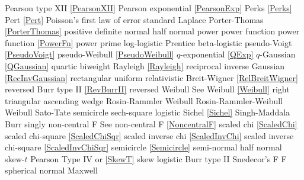 Pearson type XII 				\dotfill	\eqref{PearsonXII}					\ncite	%
Pearson exponential				\dotfill	\eqref{PearsonExp}					\mcite{\self}
Perks							\dotfill	\eqref{Perks} 						\ncite	%
Pert							\dotfill	\eqref{Pert} 						\ncite	%
Poisson's first law of error	\dotfill	standard Laplace					\ncite	%
Porter-Thomas					\dotfill	\eqref{PorterThomas}				\ncite
positive definite normal 		\dotfill	half normal 						\ncite 	%
power							\dotfill	power function 						\ncite	%
power function					\dotfill	\eqref{PowerFn}						\ncite	%
power prime						\dotfill	log-logistic						\mcite{\self}
Prentice 						\dotfill	beta-logistic							
pseudo-Voigt					\dotfill	\eqref{PseudoVoigt}					\ncite
pseudo-Weibull					\dotfill	\eqref{PseudoWeibull}				\ncite	%
%
$q$-exponential					\dotfill	\eqref{QExp}						\ncite	%
$q$-Gaussian					\dotfill	\eqref{QGaussian}					\ncite	%
quartic							\dotfill	biweight							\ncite
%
Rayleigh  						\dotfill	\eqref{Rayleigh}					\ncite	%
reciprocal inverse Gaussian		\dotfill	\eqref{RecInvGaussian}				\ncite
rectangular						\dotfill	uniform 							\ncite	%
relativistic Breit-Wigner		\dotfill	\eqref{RelBreitWigner}				\ncite	%
reversed Burr type II			\dotfill	\eqref{RevBurrII} 					\ncite	%
reversed Weibull				\dotfill	See Weibull \eqref{Weibull}			\ncite	%
right triangular				\dotfill	ascending wedge 					\ncite	%
Rosin-Rammler 					\dotfill	Weibull								   		%
Rosin-Rammler-Weibull 			\dotfill	Weibull								\ncite	%
%
Sato-Tate						\dotfill	semicircle 							\ncite	%
sech-square 					\dotfill	logistic							\ncite	%
Sichel							\dotfill	\eqref{Sichel}						\ncite	
Singh-Maddala 					\dotfill	Burr 								\ncite	%
singly non-central F       		\dotfill	See non-central F  \eqref{NoncentralF}	\ncite 
scaled chi						\dotfill	\eqref{ScaledChi}					\ncite	%
scaled chi-square 				\dotfill	\eqref{ScaledChiSqr}				\ncite	%
scaled inverse chi 				\dotfill	\eqref{ScaledInvChi}				\ncite	%
scaled inverse chi-square 		\dotfill	\eqref{ScaledInvChiSqr}				 	%
semicircle						\dotfill	\eqref{Semicircle}					\ncite	%
semi-normal 					\dotfill	half normal 						\ncite	%
skew-$t$						\dotfill	Pearson Type IV or \eqref{SkewT}	\ncite	%
skew logistic					\dotfill	Burr type II 						\ncite	%
Snedecor's F  					\dotfill	F 									\ncite	%
spherical normal				\dotfill	Maxwell								\ncite	%
